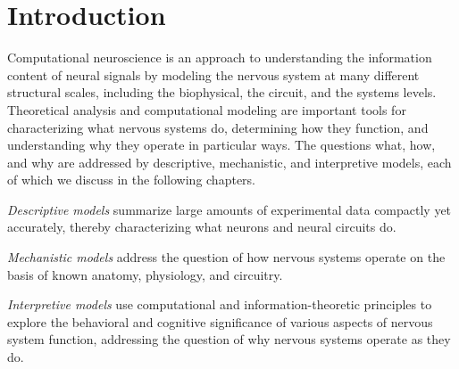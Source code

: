 \chapter*{Introduction}
\label{Introduction}

Computational neuroscience is an approach to understanding the information content of neural signals by modeling the nervous system at many different structural scales, including the biophysical, the circuit, and the systems levels. Theoretical analysis and computational modeling are important tools for characterizing what nervous systems do, determining how they function, and understanding why they operate in particular ways.
The questions what, how, and why are addressed by descriptive, mechanistic, and interpretive models, each of which we discuss in the following chapters.
\begin{defn}
  \emph{Descriptive models} summarize large amounts of experimental data compactly yet accurately, thereby characterizing what neurons and neural circuits do.
\end{defn}

\begin{defn}
   \emph{Mechanistic models} address the question of how nervous systems operate on the basis of known anatomy, physiology, and circuitry.
\end{defn}

\begin{defn}
  \emph{Interpretive models} use computational and information-theoretic principles to explore the behavioral and cognitive significance of various aspects of nervous system function, addressing the question of why nervous systems operate as they do.
\end{defn}



